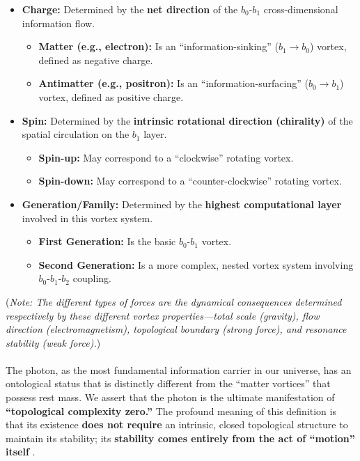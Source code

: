 \documentclass[11pt, a4paper]{article}
\begin{document}
\begin{itemize}
    \item \textbf{Charge:} Determined by the \textbf{net direction} of the $b_0$-$b_1$ cross-dimensional information flow.
    \begin{itemize}
        \item \textbf{Matter (e.g., electron):} Is an ``information-sinking'' ($b_1 \rightarrow b_0$) vortex, defined as negative charge.
        \item \textbf{Antimatter (e.g., positron):} Is an ``information-surfacing'' ($b_0 \rightarrow b_1$) vortex, defined as positive charge.
    \end{itemize}

    \item \textbf{Spin:} Determined by the \textbf{intrinsic rotational direction (chirality)} of the spatial circulation on the $b_1$ layer.
    \begin{itemize}
        \item \textbf{Spin-up:} May correspond to a ``clockwise'' rotating vortex.
        \item \textbf{Spin-down:} May correspond to a ``counter-clockwise'' rotating vortex.
    \end{itemize}

    \item \textbf{Generation/Family:} Determined by the \textbf{highest computational layer} involved in this vortex system.
    \begin{itemize}
        \item \textbf{First Generation:} Is the basic $b_0$-$b_1$ vortex.
        \item \textbf{Second Generation:} Is a more complex, nested vortex system involving $b_0$-$b_1$-$b_2$ coupling.
    \end{itemize}
\end{itemize}

(\textit{Note: The different types of forces are the dynamical consequences determined respectively by these different vortex properties—total scale (gravity), flow direction (electromagnetism), topological boundary (strong force), and resonance stability (weak force).})

\paragraph{}
The photon, as the most fundamental information carrier in our universe, has an ontological status that is distinctly different from the ``matter vortices'' that possess rest mass. We assert that the photon is the ultimate manifestation of \textbf{``topological complexity zero.''} The profound meaning of this definition is that its existence \textbf{does not require} an intrinsic, closed topological structure to maintain its stability; its \textbf{stability comes entirely from the act of ``motion'' itself} \cite{deBroglie1930}.
\end{document}
